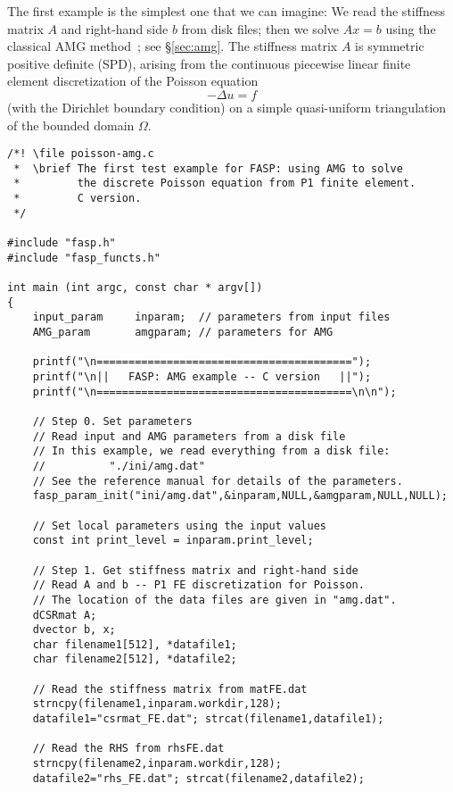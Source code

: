 \documentclass[11pt]{memoir}
\begin{document}
The first example is the simplest one that we can imagine: We read the stiffness matrix $A$ and right-hand side $b$ from disk files; then we solve $Ax=b$ using the classical AMG method~\cite{Brandt.BrandtMcCormick.1982uq,Ruge.RugeStuben.1985ij,Ruge.RugeStuben.1987bs}; see \S\ref{sec:amg}. The stiffness matrix $A$ is symmetric positive definite (SPD), arising from the continuous piecewise linear finite element discretization of the Poisson equation 
$$-\Delta u = f$$ 
(with the Dirichlet boundary condition) on a simple quasi-uniform triangulation of the bounded domain $\Omega$.

\begin{lstlisting}[stepnumber=1,firstnumber=1]
/*! \file poisson-amg.c
 *  \brief The first test example for FASP: using AMG to solve
 *         the discrete Poisson equation from P1 finite element.
 *         C version.
 */

#include "fasp.h"
#include "fasp_functs.h"

int main (int argc, const char * argv[])
{
    input_param     inparam;  // parameters from input files
    AMG_param       amgparam; // parameters for AMG

    printf("\n========================================");
    printf("\n||   FASP: AMG example -- C version   ||");
    printf("\n========================================\n\n");

    // Step 0. Set parameters
    // Read input and AMG parameters from a disk file
    // In this example, we read everything from a disk file:
    //          "./ini/amg.dat"
    // See the reference manual for details of the parameters.
    fasp_param_init("ini/amg.dat",&inparam,NULL,&amgparam,NULL,NULL);

    // Set local parameters using the input values
    const int print_level = inparam.print_level;

    // Step 1. Get stiffness matrix and right-hand side
    // Read A and b -- P1 FE discretization for Poisson.
    // The location of the data files are given in "amg.dat".
    dCSRmat A;
    dvector b, x;
    char filename1[512], *datafile1;
    char filename2[512], *datafile2;
	
    // Read the stiffness matrix from matFE.dat
    strncpy(filename1,inparam.workdir,128);
    datafile1="csrmat_FE.dat"; strcat(filename1,datafile1);

    // Read the RHS from rhsFE.dat
    strncpy(filename2,inparam.workdir,128);
    datafile2="rhs_FE.dat"; strcat(filename2,datafile2);


\end{lstlisting}
\end{document}
